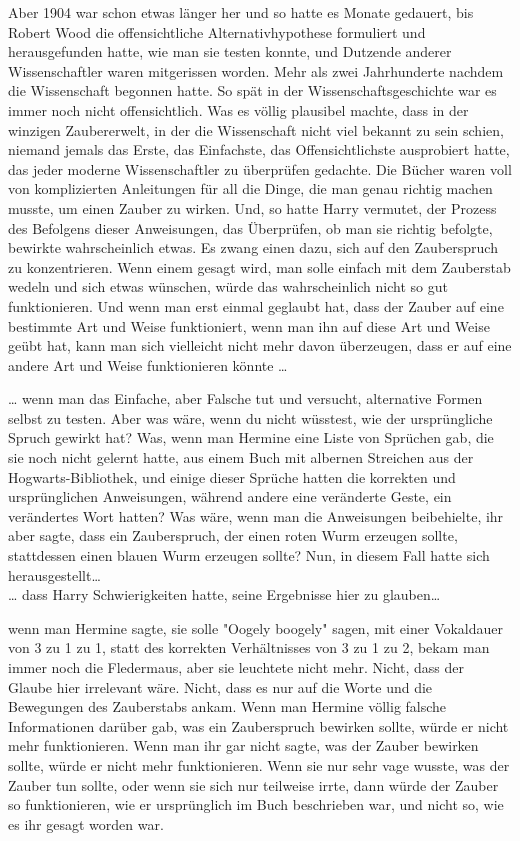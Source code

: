 {Aber 1904 war schon etwas länger her und so hatte es Monate gedauert, bis Robert Wood die offensichtliche Alternativhypothese formuliert und herausgefunden hatte, wie man sie testen konnte, und Dutzende anderer Wissenschaftler waren mitgerissen worden. Mehr als zwei Jahrhunderte nachdem die Wissenschaft begonnen hatte. So spät in der Wissenschaftsgeschichte war es immer noch nicht offensichtlich. Was es völlig plausibel machte, dass in der winzigen Zaubererwelt, in der die Wissenschaft nicht viel bekannt zu sein schien, niemand jemals das Erste, das Einfachste, das Offensichtlichste ausprobiert hatte, das jeder moderne Wissenschaftler zu überprüfen gedachte. Die Bücher waren voll von komplizierten Anleitungen für all die Dinge, die man genau richtig machen musste, um einen Zauber zu wirken. Und, so hatte Harry vermutet, der Prozess des Befolgens dieser Anweisungen, das Überprüfen, ob man sie richtig befolgte, bewirkte wahrscheinlich etwas. Es zwang einen dazu, sich auf den Zauberspruch zu konzentrieren. Wenn einem gesagt wird, man solle einfach mit dem Zauberstab wedeln und sich etwas wünschen, würde das wahrscheinlich nicht so gut funktionieren. Und wenn man erst einmal geglaubt hat, dass der Zauber auf eine bestimmte Art und Weise funktioniert, wenn man ihn auf diese Art und Weise geübt hat, kann man sich vielleicht nicht mehr davon überzeugen, dass er auf eine andere Art und Weise funktionieren könnte …

… wenn man das Einfache, aber Falsche tut und versucht, alternative Formen selbst zu testen. Aber was wäre, wenn du nicht wüsstest, wie der ursprüngliche Spruch gewirkt hat? Was, wenn man Hermine eine Liste von Sprüchen gab, die sie noch nicht gelernt hatte, aus einem Buch mit albernen Streichen aus der Hogwarts-Bibliothek, und einige dieser Sprüche hatten die korrekten und ursprünglichen Anweisungen, während andere eine veränderte Geste, ein verändertes Wort hatten? Was wäre, wenn man die Anweisungen beibehielte, ihr aber sagte, dass ein Zauberspruch, der einen roten Wurm erzeugen sollte, stattdessen einen blauen Wurm erzeugen sollte? Nun, in diesem Fall hatte sich herausgestellt…\\ … dass Harry Schwierigkeiten hatte, seine Ergebnisse hier zu glauben…

wenn man Hermine sagte, sie solle "Oogely boogely" sagen, mit einer Vokaldauer von 3 zu 1 zu 1, statt des korrekten Verhältnisses von 3 zu 1 zu 2, bekam man immer noch die Fledermaus, aber sie leuchtete nicht mehr. Nicht, dass der Glaube hier irrelevant wäre. Nicht, dass es nur auf die Worte und die Bewegungen des Zauberstabs ankam. Wenn man Hermine völlig falsche Informationen darüber gab, was ein Zauberspruch bewirken sollte, würde er nicht mehr funktionieren. Wenn man ihr gar nicht sagte, was der Zauber bewirken sollte, würde er nicht mehr funktionieren. Wenn sie nur sehr vage wusste, was der Zauber tun sollte, oder wenn sie sich nur teilweise irrte, dann würde der Zauber so funktionieren, wie er ursprünglich im Buch beschrieben war, und nicht so, wie es ihr gesagt worden war.

}
